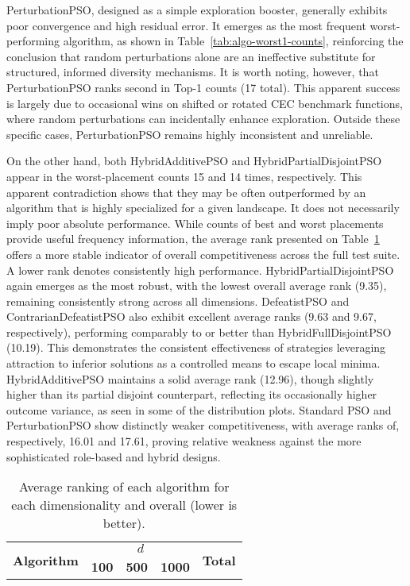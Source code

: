 { 
PerturbationPSO, designed as a simple exploration booster, generally exhibits poor convergence and high residual error. It emerges as the most frequent worst-performing algorithm, as shown in Table~\ref{tab:algo-worst1-counts}, reinforcing the conclusion that random perturbations alone are an ineffective substitute for structured, informed diversity mechanisms. It is worth noting, however, that PerturbationPSO ranks second in Top-1 counts (17 total). This apparent success is largely due to occasional wins on shifted or rotated CEC benchmark functions, where random perturbations can incidentally enhance exploration. Outside these specific cases, PerturbationPSO remains highly inconsistent and unreliable.


On the other hand, both HybridAdditivePSO and HybridPartialDisjointPSO appear in the worst-placement counts 15 and 14 times, respectively. This apparent contradiction shows that they may be often outperformed by an algorithm that is highly specialized for a given landscape. It does not necessarily imply poor absolute performance.
While counts of best and worst placements provide useful frequency information, the average rank presented on Table~\ref{tab:algo-avg-rank} offers a more stable indicator of overall competitiveness across the full test suite. A lower rank denotes consistently high performance. HybridPartialDisjointPSO again emerges as the most robust, with the lowest overall average rank (9.35), remaining consistently strong across all dimensions.
DefeatistPSO and ContrarianDefeatistPSO also exhibit excellent average ranks (9.63 and 9.67, respectively), performing comparably to or better than HybridFullDisjointPSO (10.19). This demonstrates the consistent effectiveness of strategies leveraging attraction to inferior solutions as a controlled means to escape local minima.
HybridAdditivePSO maintains a solid average rank (12.96), though slightly higher than its partial disjoint counterpart, reflecting its occasionally higher outcome variance, as seen in some of the distribution plots. Standard PSO and PerturbationPSO show distinctly weaker competitiveness, with average ranks of, respectively, 16.01 and 17.61, proving relative weakness against the more sophisticated role-based and hybrid designs.


\begin{longtable}[c]{p{5cm}cccc}
\caption[Average ranking of each algorithm across dimensions]{Average ranking of each algorithm for each dimensionality and overall (lower is better).}
\label{tab:algo-avg-rank} \\
\toprule
\multirow{2}{*}{\textbf{Algorithm}} & \multicolumn{3}{c}{$d$} & \multirow{2}{*}{\textbf{Total}}  \\
\cmidrule(lr){2-4}
 & \textbf{100} & \textbf{500} & \textbf{1000} \\ \midrule
\endfirsthead


\end{longtable}}
